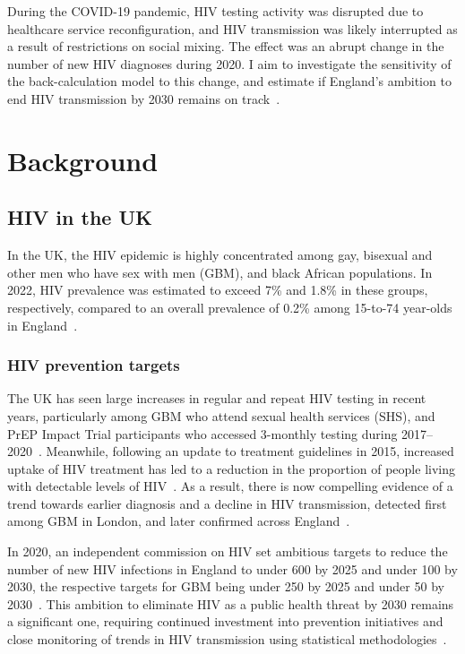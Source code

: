 During the COVID-19 pandemic, HIV testing activity was disrupted due to healthcare service reconfiguration, and HIV transmission was likely interrupted as a result of restrictions on social mixing. The effect was an abrupt change in the number of new HIV diagnoses during 2020. I aim to investigate the sensitivity of the back-calculation model to this change, and estimate if England's ambition to end HIV transmission by 2030 remains on track~\parencite{HIV_Commission2020-yy}.

\section{Background}

\subsection{HIV in the UK}

In the UK, the HIV epidemic is highly concentrated among gay, bisexual and other men who have sex with men (GBM), and black African populations. In 2022, HIV prevalence was estimated to exceed 7\% and 1.8\% in these groups, respectively, compared to an overall prevalence of 0.2\% among 15-to-74 year-olds in England~\parencite{Martin2023-um}.

\subsubsection{HIV prevention targets}

The UK has seen large increases in regular and repeat HIV testing in recent years, particularly among GBM who attend sexual health services (SHS), and PrEP Impact Trial participants who accessed 3-monthly testing during 2017--2020~\parencite{Brown2017-yu,Brown2018-nk,PrEP_Impact_Trial2020-il}. Meanwhile, following an update to treatment guidelines in 2015, increased uptake of HIV treatment has led to a reduction in the proportion of people living with detectable levels of HIV~\parencite{Churchill2016-ol, Martin2023-um}. As a result, there is now compelling evidence of a trend towards earlier diagnosis and a decline in HIV transmission, detected first among GBM in London, and later confirmed across England~\parencite{Brown2017-yu, Brizzi2021-zl}.

In 2020, an independent commission on HIV set ambitious targets to reduce the number of new HIV infections in England to under 600 by 2025 and under 100 by 2030, the respective targets for GBM being under 250 by 2025 and under 50 by 2030~\parencite{HIV_Commission2020-yy}. This ambition to eliminate HIV as a public health threat by 2030 remains a significant one, requiring continued investment into prevention initiatives and close monitoring of trends in HIV transmission using statistical methodologies~\parencite{HIV_Commission2020-yy, Department_of_Health_and_Social_Care2019-gd}.

